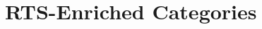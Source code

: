\documentclass[11pt,notitlepage,a4paper]{report}
\begin{document}
  
  
  
  
  

\chapter{RTS-Enriched Categories}

  

\clearpage
{}
{}



\end{document}
